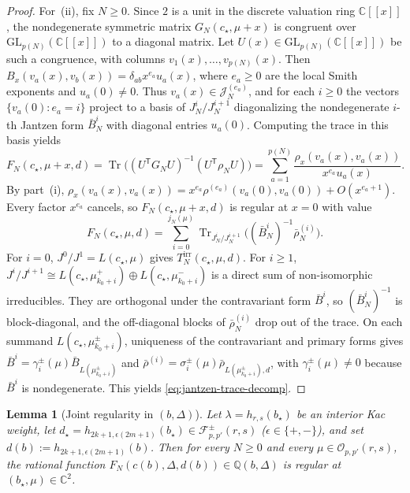 \documentclass[twoside,10pt]{article}
\numberwithin{equation}{section}
\theoremstyle{slbody}
\newtheorem{lemma}[theorem]{Lemma}
\theoremstyle{definition}
\theoremstyle{remark}
\newcommand{\Tr}{\operatorname{Tr}}
\begin{document}
\begin{proof}
For~(ii), fix \(N\geq0\).  Since \(2\) is a unit in the discrete valuation
ring \(\mathbb{C}[[x]]\), the nondegenerate symmetric matrix
\(G_N(c_\star,\mu+x)\) is congruent over
\(\mathrm{GL}_{p(N)}(\mathbb{C}[[x]])\) to a diagonal matrix.  Let
\(U(x)\in\mathrm{GL}_{p(N)}(\mathbb{C}[[x]])\) be such a congruence, with
columns \(v_1(x),\ldots,v_{p(N)}(x)\).  Then
\(B_x(v_a(x),v_b(x))=\delta_{ab}x^{e_a}u_a(x)\), where \(e_a\geq0\) are the
local Smith exponents and \(u_a(0)\neq0\).  Thus
\(v_a(x)\in\mathcal{J}^{(e_a)}_N\), and for each \(i\geq0\) the vectors
\(\{v_a(0):e_a=i\}\) project to a basis of \(J^i_N/J^{i+1}_N\) diagonalizing
the nondegenerate \(i\)-th Jantzen form \(\bar B^i_N\) with diagonal
entries \(u_a(0)\).  Computing the trace in this basis yields
\[
 F_N(c_\star,\mu+x,d)
 =\Tr\bigl((U^{\mathsf{T}}G_NU)^{-1}(U^{\mathsf{T}}\rho_NU)\bigr)
 =\sum_{a=1}^{p(N)}\frac{\rho_x(v_a(x),v_a(x))}{x^{e_a}u_a(x)}.
\]
By part~(i), \(\rho_x(v_a(x),v_a(x))=x^{e_a}\rho^{(e_a)}(v_a(0),v_a(0))+O(x^{e_a+1})\).
Every factor \(x^{e_a}\) cancels, so \(F_N(c_\star,\mu+x,d)\) is regular at
\(x=0\) with value
\[
 F_N(c_\star,\mu,d)
 =\sum_{i=0}^{j_N(\mu)}\Tr_{J^i_N/J^{i+1}_N}
   \bigl((\bar B^i_N)^{-1}\bar\rho^{(i)}_N\bigr).
\]
For \(i=0\), \(J^0/J^1=L(c_\star,\mu)\) gives \(T^{\mathrm{irr}}_N(c_\star,\mu,d)\).
For \(i\geq1\), \(J^i/J^{i+1}\cong L(c_\star,\mu^+_{k_0+i})\oplus
L(c_\star,\mu^-_{k_0+i})\) is a direct sum of non-isomorphic irreducibles.
They are orthogonal under the contravariant form \(\bar B^i\), so
\((\bar B^i_N)^{-1}\) is block-diagonal, and the off-diagonal blocks of
\(\bar\rho^{(i)}_N\) drop out of the trace.  On each summand
\(L(c_\star,\mu^\pm_{k_0+i})\), uniqueness of the contravariant and primary
forms gives \(\bar B^i=\gamma^\pm_i(\mu)\bar B_{L(\mu^\pm_{k_0+i})}\) and
\(\bar\rho^{(i)}=\sigma^\pm_i(\mu)\bar\rho_{L(\mu^\pm_{k_0+i}),d}\), with
\(\gamma^\pm_i(\mu)\neq0\) because \(\bar B^i\) is nondegenerate.  This
yields \eqref{eq:jantzen-trace-decomp}.
\end{proof}

\begin{lemma}[Joint regularity in \((b,\Delta)\)]\label{lem:joint-holomorphicity}
Let \(\lambda=h_{r,s}(b_\star)\) be an interior Kac weight, let
\(d_\star=h_{2k+1,\epsilon(2m+1)}(b_\star)\in\mathcal{F}^\pm_{p,p'}(r,s)\)
(\(\epsilon\in\{+,-\}\)), and set \(d(b):=h_{2k+1,\epsilon(2m+1)}(b)\).  Then
for every \(N\geq0\) and every \(\mu\in\mathcal{O}_{p,p'}(r,s)\), the rational
function \(F_N(c(b),\Delta,d(b))\in\mathbb{Q}(b,\Delta)\) is regular at
\((b_\star,\mu)\in\mathbb{C}^2\).
\end{lemma}
\end{document}
